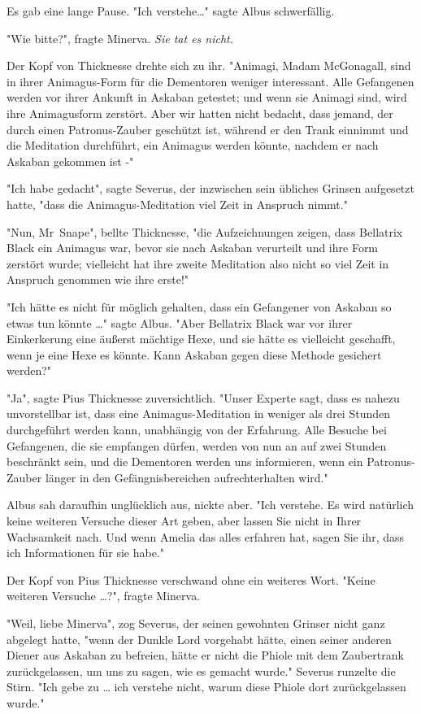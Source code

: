 {Es gab eine lange Pause. "Ich verstehe…" sagte Albus schwerfällig.

"Wie bitte?", fragte Minerva. \emph{Sie tat es nicht.}

Der Kopf von Thicknesse drehte sich zu ihr. "Animagi, Madam McGonagall, sind in ihrer Animagus-Form für die Dementoren weniger interessant. Alle Gefangenen werden vor ihrer Ankunft in Askaban getestet; und wenn sie Animagi sind, wird ihre Animagusform zerstört. Aber wir hatten nicht bedacht, dass jemand, der durch einen Patronus-Zauber geschützt ist, während er den Trank einnimmt und die Meditation durchführt, ein Animagus werden könnte, nachdem er nach Askaban gekommen ist -"

"Ich habe gedacht", sagte Severus, der inzwischen sein übliches Grinsen aufgesetzt hatte, "dass die Animagus-Meditation viel Zeit in Anspruch nimmt."

"Nun, Mr~Snape", bellte Thicknesse, "die Aufzeichnungen zeigen, dass Bellatrix Black ein Animagus war, bevor sie nach Askaban verurteilt und ihre Form zerstört wurde; vielleicht hat ihre zweite Meditation also nicht so viel Zeit in Anspruch genommen wie ihre erste!"

"Ich hätte es nicht für möglich gehalten, dass ein Gefangener von Askaban so etwas tun könnte …" sagte Albus. "Aber Bellatrix Black war vor ihrer Einkerkerung eine äußerst mächtige Hexe, und sie hätte es vielleicht geschafft, wenn je eine Hexe es könnte. Kann Askaban gegen diese Methode gesichert werden?"

"Ja", sagte Pius Thicknesse zuversichtlich. "Unser Experte sagt, dass es nahezu unvorstellbar ist, dass eine Animagus-Meditation in weniger als drei Stunden durchgeführt werden kann, unabhängig von der Erfahrung. Alle Besuche bei Gefangenen, die sie empfangen dürfen, werden von nun an auf zwei Stunden beschränkt sein, und die Dementoren werden uns informieren, wenn ein Patronus-Zauber länger in den Gefängnisbereichen aufrechterhalten wird."

Albus sah daraufhin unglücklich aus, nickte aber. "Ich verstehe. Es wird natürlich keine weiteren Versuche dieser Art geben, aber lassen Sie nicht in Ihrer Wachsamkeit nach. Und wenn Amelia das alles erfahren hat, sagen Sie ihr, dass ich Informationen für sie habe."

Der Kopf von Pius Thicknesse verschwand ohne ein weiteres Wort. "Keine weiteren Versuche …?", fragte Minerva.

"Weil, liebe Minerva", zog Severus, der seinen gewohnten Grinser nicht ganz abgelegt hatte, "wenn der Dunkle Lord vorgehabt hätte, einen seiner anderen Diener aus Askaban zu befreien, hätte er nicht die Phiole mit dem Zaubertrank zurückgelassen, um uns zu sagen, wie es gemacht wurde." Severus runzelte die Stirn. "Ich gebe zu … ich verstehe nicht, warum diese Phiole dort zurückgelassen wurde."

}
